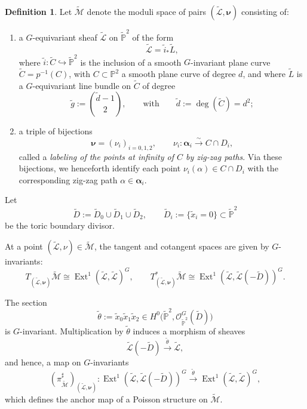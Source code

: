 \documentclass[dvipsnames,11pt]{article}
\theoremstyle{definition}
\newtheorem{definition}[theorem]{Definition}
\renewcommand{\P}{{\mathbb P}}
\def\zz{\bm \alpha}
\def\Ext{\operatorname{Ext}}
\def\Ext{\operatorname{Ext}}
\begin{document}
\begin{definition}
Let $\widetilde{\mathcal M}$ denote the moduli space of pairs $(\widetilde{\mathcal L},\bm\nu)$ consisting of:
\begin{enumerate}
\item a $G$-equivariant sheaf $\widetilde{\mathcal L}$ on $\widetilde\P^2$ of the form
\[
\widetilde{\mathcal L}=\widetilde i_*\widetilde L,
\]
where $\widetilde i:\widetilde C\hookrightarrow \widetilde\P^2$ is the inclusion of a smooth
$G$-invariant plane curve $\widetilde C=p^{-1}(C)$, with $C\subset \P^2$ a smooth plane curve of degree $d$, and where $\widetilde L$ is a $G$-equivariant line bundle on $\widetilde C$ of degree
\[
\widetilde g:=\binom{\widetilde d-1}{2},
\qquad\text{with}\qquad
\widetilde d:=\deg(\widetilde C)=d^2;
\]
\item a triple of bijections
\[
\bm\nu=(\nu_i)_{i=0,1,2},
\qquad
\nu_i:\zz_i \xrightarrow{\sim} C\cap D_i,
\]
called a \emph{labeling of the points at infinity of \(C\) by zig-zag paths}. 
Via these bijections, we henceforth identify each point \(\nu_i(\alpha)\in C\cap D_i\) with the corresponding zig-zag path \(\alpha\in\zz_i\).
\end{enumerate}
\end{definition}

Let
\[
\widetilde D:=\widetilde D_0\cup \widetilde D_1\cup \widetilde D_2,\qquad \widetilde D_i:=\{\widetilde x_i=0\}\subset \widetilde \P^2
\]
be the toric boundary divisor. 



At a point $(\widetilde{\mathcal L},\nu)\in \widetilde{\mathcal M}$, the tangent and cotangent
spaces are given by $G$-invariants:
\[
T_{(\widetilde{\mathcal L},\bm\nu)}\widetilde{\mathcal M}
\cong \Ext^1(\widetilde{\mathcal L},\widetilde{\mathcal L})^{G},
\qquad
T^*_{(\widetilde{\mathcal L},\bm\nu)}\widetilde{\mathcal M}
\cong \Ext^1(\widetilde{\mathcal L},\widetilde{\mathcal L}(-\widetilde D))^{G}.
\]

The section
\[
\widetilde\theta:=\widetilde x_0\widetilde x_1\widetilde x_2 \in
H^0 \bigl(\widetilde\P^2,\mathcal O_{\widetilde\P^2}^G(\widetilde D)\bigr)
\]
is $G$-invariant. Multiplication by $\widetilde\theta$ induces a morphism of sheaves
\[
\widetilde{\mathcal L}(-\widetilde D)\xrightarrow{\ \widetilde\theta\ }\widetilde{\mathcal L},
\]
and hence, a map on $G$-invariants
\[
(\pi^\sharp_{\widetilde{\mathcal M}})_{(\widetilde{\mathcal L},\bm \nu)}:
\Ext^1(\widetilde{\mathcal L},\widetilde{\mathcal L}(-\widetilde D))^{G}
\xrightarrow{\ \widetilde\theta\ }
\Ext^1(\widetilde{\mathcal L},\widetilde{\mathcal L})^{G},
\]
which defines the anchor map of a Poisson structure on $\widetilde{\mathcal M}$.
\end{document}
